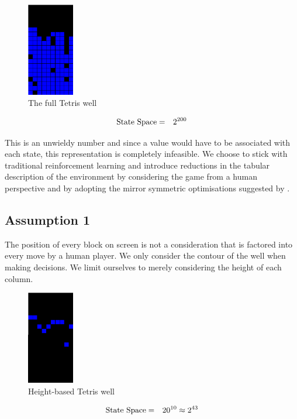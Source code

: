 \documentclass{rucsthesis}
\begin{document}
\begin{figure}[h]
\centering
\includegraphics[width=0.8in]{fullwell.png}
\caption{The full Tetris well}
\label{fig:fullwell}
\end{figure}

\begin{eqnarray*}
\centering
\textrm{State Space} & = & 2^{200} 
\end{eqnarray*}

This is an unwieldy number and since a value would have to be associated with each state, this representation is completely infeasible. We choose to stick with traditional reinforcement learning and introduce reductions in the tabular description of the environment by considering the game from a human perspective and by adopting the mirror symmetric optimisations suggested by \cite{yaeltetris}. 

\subsection*{Assumption 1}

The position of every block on screen is not a consideration that is factored into every move by a human player. We only consider the contour of the well when making decisions. We limit ourselves to merely considering the height of each column.

\begin{figure}[h]
\centering
\includegraphics[width=0.8in]{heightwell.png}
\caption{Height-based Tetris well}
\label{fig:heightwell}
\end{figure}

\begin{eqnarray*}
\centering
\textrm{State Space} & = & 20^{10} \approx 2^{43}
\end{eqnarray*}
\end{document}
